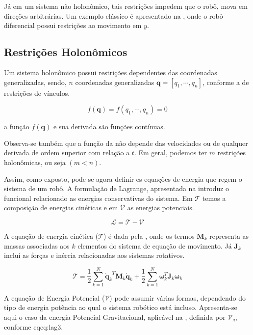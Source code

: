 Já em um sistema não holonômico, tais restrições impedem que o robô, mova em direções arbitrárias. Um exemplo clássico é apresentado na  , onde o robô diferencial possui restrições ao movimento em $y$.

\subsection{Restrições Holonômicos}

Um sistema holonômico possui restrições dependentes das coordenadas generalizadas, sendo, $n$ coordenadas generalizadas $\mathbf{q} = [q_1, \cdots, q_n]$, conforme a  de restrições de vínculos.

\begin{equation}
    f(\mathbf{q}) = f(q_1, \cdots, q_n) = 0
    \label{eq:homo}
\end{equation}

\noindent a função $f(\mathbf{q})$ e sua derivada são funções contínuas.

Observa-se também que a função da  não depende das velocidades ou de qualquer derivada de ordem superior com relação a $t$. Em geral, podemos ter $m$ restrições holonômicas, ou seja $(m<n)$. 

Assim, como exposto, pode-se agora definir es equações de energia que regem o sistema de um robô. A formulação de Lagrange, apresentada na  introduz o funcional relacionado as energias conservativas do sistema. Em $\mathcal{T}$ temos a composição de energias cinéticas e em $\mathcal{V}$ as energias potenciais.

\begin{equation}
    \mathcal{L}= \mathcal{T} - \mathcal{V}
    \label{eq:lag1}
\end{equation}

A equação de energia cinética ($\mathcal{T}$) é dada pela , onde os termos $\mathbf{M}_k$ representa as massas associadas aos $k$ elementos do sistema de equação de movimento. Já $\mathbf{J}_k $ inclui as forças e inércia relacionadas aos sistemas rotativos.

\begin{equation}
  \mathcal{T} = \frac{1}{2} \sum\limits_{k=1}^{N}{\mathbf{\dot{q}}_k}^T  \mathbf{M}_k {\mathbf{\dot{q}}_k}+ \frac{1}{2} \sum\limits_{k=1}^{N}\mathbf{\omega}_k^T \mathbf{J}_k \mathbf{\omega}_k
  \label{eq:lag2}
\end{equation}

A equação de Energia Potencial ($\mathcal{V}$) pode assumir várias formas, dependendo do tipo de energia potência ao qual o sistema robótico está incluso. Apresenta-se aqui o caso da energia Potencial Gravitacional, aplicável na , definida por $\mathcal{V}_g$, conforme eq{eq:lag3}.

